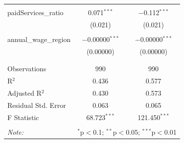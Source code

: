 \documentclass[alpha-refs]{wiley-article-05g}
\begin{document}
\begin{table}[!htbp]
\begin{tabular}{@{\extracolsep{5pt}}lcc}
		& & \\ 
		paidServices\_ratio & 0.071$^{***}$ & $-$0.112$^{***}$ \\ 
		& (0.021) & (0.021) \\ 
		& & \\ 
		annual\_wage\_region & $-$0.00000$^{***}$ & $-$0.00000$^{***}$ \\ 
		& (0.00000) & (0.00000) \\ 
		& & \\ 
		\hline \\[-1.8ex] 
		Observations & 990 & 990 \\ 
		R$^{2}$ & 0.436 & 0.577 \\ 
		Adjusted R$^{2}$ & 0.430 & 0.573 \\ 
		Residual Std. Error & 0.063 & 0.065 \\ 
		F Statistic & 68.723$^{***}$ & 121.450$^{***}$ \\ 
		\hline 
		\hline \\[-1.8ex] 
		\textit{Note:}  & \multicolumn{2}{r}{$^{*}$p$<$0.1; $^{**}$p$<$0.05; $^{***}$p$<$0.01} \\ 
	\end{tabular} 
\end{table} 
\end{document}
